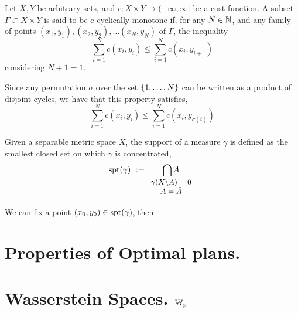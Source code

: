 \begin{definition}
	Let $X , Y$ be arbitrary sets, and $c:X\times Y \rightarrow (-\infty, \infty]$ be a cost function. A subset $\Gamma \subset X \times Y$ is said to be c-cyclically monotone if, for any $N\in\mathbb{N}$, and any family of points $(x_1, y_1), (x_2, y_2), \dots (x_N, y_N)$ of $\Gamma$, the inequality
	\begin{equation*}
		\sum_{i=1}^{N} c(x_i, y_i) \leq \sum_{i=1}^{N} c(x_i, y_{i+1}) 
	\end{equation*} 
	considering $N+1=1$. 
\end{definition}
Since any permutation $\sigma$ over the set $\left\lbrace 1, \dots, N \right\rbrace$ can be written as a product of disjoint cycles, we have that this property satisfies,
\begin{equation}
		\sum_{i=1}^{N} c(x_i, y_i) \leq \sum_{i=1}^{N} c(x_i, y_{\sigma(i)}) 
\end{equation}
\begin{definition}
	Given a separable metric space $X$, the support of a measure $\gamma$ is defined as the smallest closed set on which $\gamma$ is concentrated,
	\begin{equation}
	\spt(\gamma)\ :=\underset{\small{\begin{array}{c}
		\gamma(X\backslash A)=0\\ A=\bar{A}  \end{array}}}{\bigcap A} 		
	\end{equation} 
\end{definition}
We can fix a point $(x_0, y_0) \in \mathrm{spt}(\gamma)$, then 
\begin{theorem}
	
\end{theorem}

\section{Properties of Optimal plans.}
\section{Wasserstein Spaces. $\mathbb{W}_{p}$}